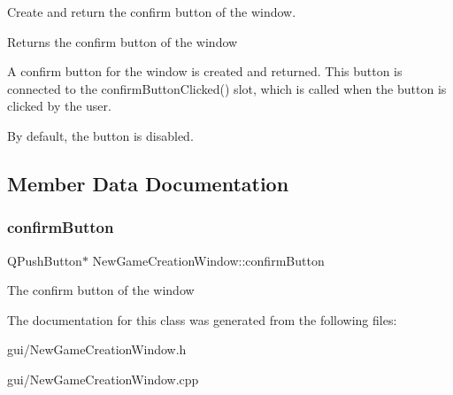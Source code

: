 Create and return the confirm button of the window. 

\begin{DoxyReturn}{Returns}
the confirm button of the window
\end{DoxyReturn}
A confirm button for the window is created and returned. This button is connected to the confirm\+Button\+Clicked() slot, which is called when the button is clicked by the user.

By default, the button is disabled. 

\subsection{Member Data Documentation}
\mbox{\label{classNewGameCreationWindow_a8d0d915f4fb0df24683813e33442219b}} 
\subsubsection{\texorpdfstring{confirm\+Button}{confirmButton}}
{\footnotesize\ttfamily Q\+Push\+Button$\ast$ New\+Game\+Creation\+Window\+::confirm\+Button\hspace{0.3cm}{\ttfamily [protected]}}

The confirm button of the window 

The documentation for this class was generated from the following files\+:\begin{DoxyCompactItemize}
\item 
gui/New\+Game\+Creation\+Window.\+h\item 
gui/New\+Game\+Creation\+Window.\+cpp\end{DoxyCompactItemize}
